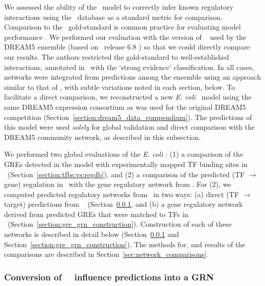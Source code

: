 We assessed the ability of the \egrine\ model to correctly infer known
regulatory interactions using the \rdb\ database as a standard metric
for comparison. Comparison to the \rdb\ gold-standard is common
practice for evaluating model performance \cite{Marbach2012}. We
performed our evaluation with the version of \rdb~ used by the DREAM5
ensemble (based on \rdb\ release 6.8 \cite{Marbach2012}) so that we
could directly compare our results. The authors \cite{Marbach2012}
restricted the gold-standard to well-established interactions,
annotated in \rdb\ with the `strong evidence' classification. In all
cases, networks were integrated from predictions among the ensemble
using an approach similar to that of \cite{Marbach2012}, with subtle
variations noted in each section, below. To facilitate a direct
comparison, we reconstructed a new {\it E. coli} \egrine\ model using
the same DREAM5 expression consortium as was used for the original
DREAM5 competition (Section~\ref{section:dream5_data_compendium}). The
predictions of this model were used {\it solely} for global validation
and direct comparison with the DREAM5 community network, as described
in this subsection.

We performed two global evaluations of the {\it E. coli} \egrine: (1)
a comparison of the GREs detected in the model with experimentally
mapped TF binding sites in \rdb~(Section~\ref{section:tfbs:vs:regdb}),
and (2) a comparison of the predicted (TF $\rightarrow$ gene) regulation
in \egrine~with the gene regulatory network from
\cite{Marbach2012}. For (2), we computed predicted regulatory networks
from \egrine~in two ways: (a) direct (TF $\rightarrow$ target)
predictions from \nwinf~ (Section~\ref{sec:nwinf_network}, and (b) a
gene regulatory network derived from predicted GREs that were matched
to TFs in
\rdb~(Section~\ref{section:gre_grn_construction}). Construction of
each of these networks is described in detail below
(Section~\ref{sec:nwinf_network} and
Section~\ref{section:gre_grn_construction}). The methods for, and
results of the comparisons are described in
Section~\ref{sec:network_comparisons}.

\subsubsection{Conversion of \egrine~\nwinf~influence predictions into a GRN}
\label{sec:nwinf_network}

